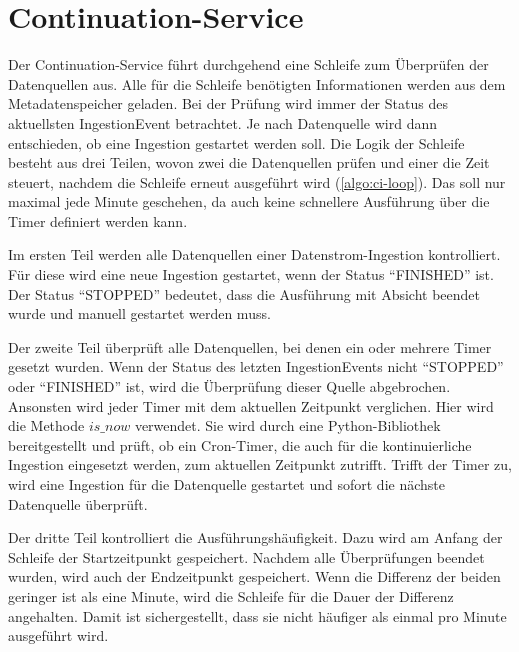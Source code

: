 \section{Continuation-Service}

Der Continuation-Service führt durchgehend eine Schleife zum Überprüfen der Datenquellen aus.
Alle für die Schleife benötigten Informationen werden aus dem Metadatenspeicher geladen.
Bei der Prüfung wird immer der Status des aktuellsten IngestionEvent betrachtet.
Je nach Datenquelle wird dann entschieden, ob eine Ingestion gestartet werden soll.
Die Logik der Schleife besteht aus drei Teilen, wovon zwei die Datenquellen prüfen und einer die Zeit steuert, nachdem die Schleife erneut ausgeführt wird (\cref{algo:ci-loop}).
Das soll nur maximal jede Minute geschehen, da auch keine schnellere Ausführung über die Timer definiert werden kann.

Im ersten Teil werden alle Datenquellen einer Datenstrom-Ingestion kontrolliert.
Für diese wird eine neue Ingestion gestartet, wenn der Status "`FINISHED"' ist.
Der Status "`STOPPED"' bedeutet, dass die Ausführung mit Absicht beendet wurde und manuell gestartet werden muss.

Der zweite Teil überprüft alle Datenquellen, bei denen ein oder mehrere Timer gesetzt wurden.
Wenn der Status des letzten IngestionEvents nicht "`STOPPED"' oder "`FINISHED"' ist, wird die Überprüfung dieser Quelle abgebrochen.
Ansonsten wird jeder Timer mit dem aktuellen Zeitpunkt verglichen.
Hier wird die Methode $is\_now$ verwendet.
Sie wird durch eine Python-Bibliothek bereitgestellt und prüft, ob ein Cron-Timer, die auch für die kontinuierliche Ingestion eingesetzt werden, zum aktuellen Zeitpunkt zutrifft.
Trifft der Timer zu, wird eine Ingestion für die Datenquelle gestartet und sofort die nächste Datenquelle überprüft.

Der dritte Teil kontrolliert die Ausführungshäufigkeit.
Dazu wird am Anfang der Schleife der Startzeitpunkt gespeichert.
Nachdem alle Überprüfungen beendet wurden, wird auch der Endzeitpunkt gespeichert.
Wenn die Differenz der beiden geringer ist als eine Minute, wird die Schleife für die Dauer der Differenz angehalten.
Damit ist sichergestellt, dass sie nicht häufiger als einmal pro Minute ausgeführt wird.


